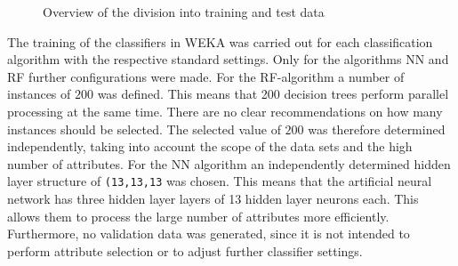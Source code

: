 \begin{figure}[ht]
  \qquad
  \qquad
  \caption{Overview of the division into training and test data\label{fig:splits}}
\end{figure}

The training of the classifiers in WEKA was carried out for each classification algorithm with the respective standard settings. Only for the algorithms NN and RF further configurations were made. For the RF-algorithm a number of instances of $200$ was defined. This means that 200 decision trees perform parallel processing at the same time. There are no clear recommendations on how many instances should be selected. The selected value of $200$ was therefore determined independently, taking into account the scope of the data sets and the high number of attributes. For the NN algorithm an independently determined hidden layer structure of \texttt{(13,13,13} was chosen. This means that the artificial neural network has three hidden layer layers of 13 hidden layer neurons each. This allows them to process the large number of attributes more efficiently. Furthermore, no validation data was generated, since it is not intended to perform attribute selection or to adjust further classifier settings.

